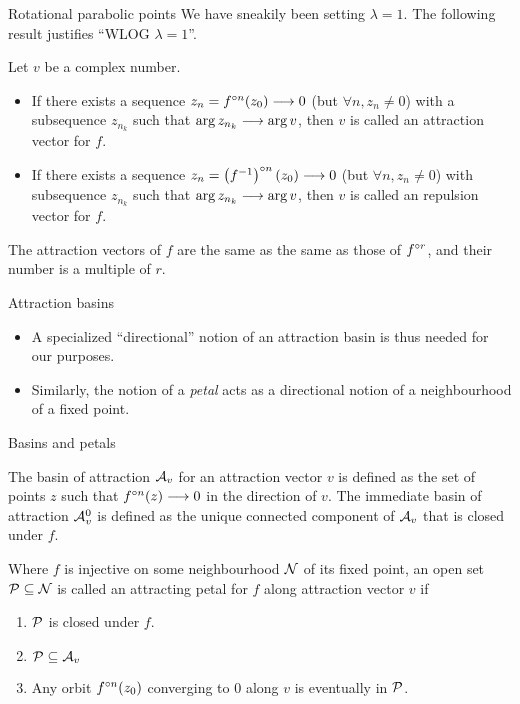 \begin{frame}{Rotational parabolic points}
    We have sneakily been setting $\lambda = 1$. The following result justifies ``WLOG $\lambda = 1$''.\newline
    \begin{dfn}
        Let $v$ be a complex number.  
        \begin{itemize}
            \item If there exists a sequence $z_n=f^{\circ n}(z_0)\longrightarrow 0$ (but $\forall n, z_n\ne 0$) with a subsequence $z_{n_k}$ such that $\arg z_{n_k}\longrightarrow\arg v$, then $v$ is called an attraction vector for $f$.
            \item If there exists a sequence $z_n=\left(f^{-1}\right)^{\circ n}(z_0)\longrightarrow 0$ (but $\forall n, z_n\ne 0$) with subsequence $z_{n_k}$ such that $\arg z_{n_k}\longrightarrow\arg v$, then $v$ is called an repulsion vector for $f$.
        \end{itemize}
    \end{dfn} 
    \begin{thm}
        The attraction vectors of $f$ are the same as the same as those of $f^{\circ r}$, and their number is a multiple of $r$.
    \end{thm}
\end{frame}
\begin{frame}{Attraction basins}
    \begin{itemize}
        \item A specialized ``directional'' notion of an attraction basin is thus needed for our purposes.
        \item Similarly, the notion of a \emph{petal} acts as a directional notion of a neighbourhood of a fixed point.
    \end{itemize}
\end{frame}
\begin{frame}{Basins and petals}
    \begin{dfn}
        The basin of attraction $\mathcal{A}_v$ for an attraction vector $v$ is defined as the set of points $z$ such that $f^{\circ n}(z)\longrightarrow 0$ in the direction of $v$. The immediate basin of attraction $\mathcal{A}_v^0$ is defined as the unique connected component of $\mathcal{A}_v$ that is closed under $f$.
    \end{dfn}
    \begin{dfn}
        Where $f$ is injective on some neighbourhood $\mathcal{N}$ of its fixed point, an open set $\mathcal{P} \subseteq \mathcal{N}$ is called an attracting petal for $f$ along attraction vector $v$ if 
        \begin{enumerate} 
            \item $\mathcal{P}$ is closed under $f$.
            \item $\mathcal{P}\subseteq\mathcal{A}_v$
            \item Any orbit $f^{\circ n}(z_0)$ converging to 0 along $v$ is eventually in $\mathcal{P}$. 
        \end{enumerate}
    \end{dfn}
\end{frame}
